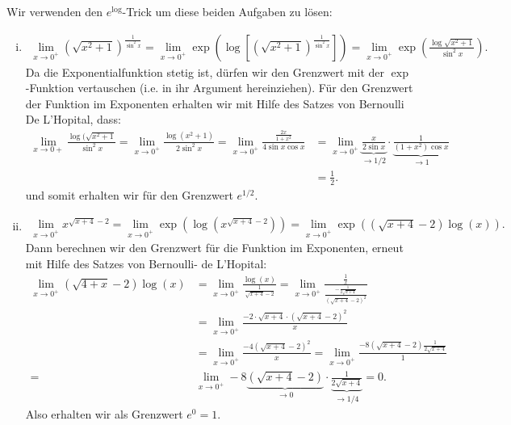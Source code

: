 \documentclass[a4paper, 20]{exam}
\begin{document}
\begin{solution} Wir verwenden den $e^{\log}$-Trick um diese beiden Aufgaben zu lösen: 
\begin{enumerate}[i)] 
\item 
\begin{align*}
 \lim_{x \rightarrow 0^+} \left( \sqrt{x^2 +1} \right)^{ \frac{1}{\sin^2 x}} = \lim_{ x \rightarrow 0^+} \exp \left( \log \left[ \left( \sqrt{x^2+1}\right)^\frac{1}{\sin^2x} \right] \right) = \lim_{x \rightarrow 0^+} \exp \left( \frac{\log \sqrt{x^2+1}}{\sin^2 x} \right). 
\end{align*}
Da die Exponentialfunktion stetig ist, dürfen wir den Grenzwert mit der $\exp$-Funktion vertauschen (i.e. in ihr Argument hereinziehen). Für den Grenzwert der Funktion im Exponenten erhalten wir mit Hilfe des Satzes von Bernoulli De L'Hopital, dass:
\begin{align*}
\lim_{x \rightarrow 0+} \frac{\log ( \sqrt{x^2+1}}{\sin^2x} = \lim_{x \rightarrow 0^+} \frac{\log(x^2+1)}{2 \sin^2 x} = \lim_{x \rightarrow 0^+} \frac{\frac{2x}{1+x^2}}{4 \sin x \cos x} &= \lim_{x \rightarrow 0^+} \underbrace{\frac{x}{2 \sin x}}_{ \longrightarrow 1/2} \cdot \underbrace{\frac{1}{(1+x^2) \cos x}}_{ \longrightarrow 1}   
\\ & = \frac{1}{2}.
\end{align*}
und somit erhalten wir für den Grenzwert $e^{1/2}$. 

\item 
\begin{align*}
\lim_{x \rightarrow 0^+} x^{ \sqrt{x+4}-2} = \lim_{x \rightarrow 0^+} \exp \left( \log \left( x^{ \sqrt{x+4}-2} \right) \right) = \lim_{x \rightarrow 0^+} \exp \left( (\sqrt{x+4}-2) \log(x) \right). 
\end{align*}
Dann berechnen wir den Grenzwert für die Funktion im Exponenten, erneut mit Hilfe des Satzes von Bernoulli- de L'Hopital:
\begin{align*}
\lim_{ x \rightarrow 0^+} ( \sqrt{4+x}-2) \log(x) & = \lim_{x \rightarrow 0^+} \frac{\log (x)}{\frac{1}{\sqrt{x+4}-2}} = \lim_{x \rightarrow 0^+} \frac{\frac{1}{x}}{\frac{- \frac{1}{2 \sqrt{x+4}}}{(\sqrt{x+4}-2)^2}} \\
&= \lim_{x \rightarrow 0^+} \frac{-2 \cdot \sqrt{x+4} \cdot ( \sqrt{x+4}-2)^2}{x} \\
&=  \lim_{x \rightarrow 0^+} \frac{-4 ( \sqrt{x+4}-2)^2}{x} = \lim_{x \rightarrow 0^+} \frac{-8( \sqrt{x+4}-2) \frac{1}{2 \sqrt{x+4}}}{1} \\
= & \lim_{x \rightarrow 0^+} -8 \underbrace{( \sqrt{x+4}-2)}_{ \longrightarrow 0} \cdot \underbrace{\frac{1}{2 \sqrt{x+4}}}_{ \longrightarrow 1/4}  = 0 .
\end{align*}
Also erhalten wir als Grenzwert $e^0=1$. 
\end{enumerate}
\end{solution}
\end{document}
